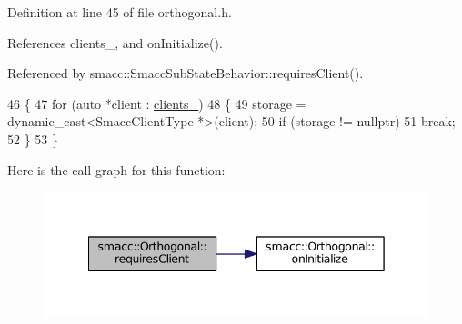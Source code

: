 Definition at line 45 of file orthogonal.\+h.



References clients\+\_\+, and on\+Initialize().



Referenced by smacc\+::\+Smacc\+Sub\+State\+Behavior\+::requires\+Client().


\begin{DoxyCode}
46     \{
47         \textcolor{keywordflow}{for} (\textcolor{keyword}{auto} *client : \hyperlink{classsmacc_1_1Orthogonal_acdcb1b5dca84a6521ef25f07212afa5e}{clients\_})
48         \{
49             storage = \textcolor{keyword}{dynamic\_cast<}SmaccClientType *\textcolor{keyword}{>}(client);
50             \textcolor{keywordflow}{if} (storage != \textcolor{keyword}{nullptr})
51                 \textcolor{keywordflow}{break};
52         \}
53     \}
\end{DoxyCode}


Here is the call graph for this function\+:
\nopagebreak
\begin{figure}[H]
\begin{center}
\leavevmode
\includegraphics[width=342pt]{classsmacc_1_1Orthogonal_af6f6d9cc5bf5433f5fe3b640a6a0b8aa_cgraph}
\end{center}
\end{figure}




